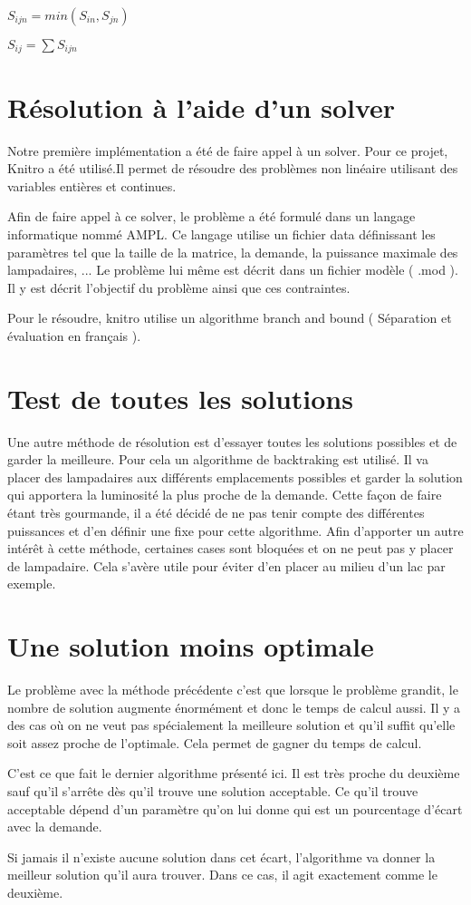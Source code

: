 $
S_{ijn}=min(S_{in},S_{jn})
$

$
S_{ij}=\sum{S_{ijn}}
$

\section{Résolution à l'aide d'un solver}
Notre première implémentation a été de faire appel à un solver. Pour ce projet, Knitro a été utilisé.Il permet de résoudre des problèmes non linéaire utilisant des variables entières et continues.

Afin de faire appel à ce solver, le problème a été formulé dans un langage informatique nommé AMPL. Ce langage utilise un fichier data définissant les paramètres tel que la taille de la matrice, la demande, la puissance maximale des lampadaires, ... 
Le problème lui même est décrit dans un fichier modèle ( .mod ). Il y est décrit l'objectif du problème ainsi que ces contraintes.

Pour le résoudre, knitro utilise un algorithme branch and bound ( Séparation et évaluation en français ).


\section{Test de toutes les solutions}
Une autre méthode de résolution est d'essayer toutes les solutions possibles et de garder la meilleure. Pour cela un algorithme de backtraking est utilisé. Il va placer des lampadaires aux différents emplacements possibles et garder la solution qui apportera la luminosité la plus proche de la demande.
Cette façon de faire étant très gourmande, il a été décidé de ne pas tenir compte des différentes puissances et d'en définir une fixe pour cette algorithme. Afin d'apporter un autre intérêt à cette méthode,  certaines cases sont bloquées et on ne peut pas y placer de lampadaire. Cela s'avère utile pour éviter d'en placer au milieu d'un lac par exemple.

\section{Une solution moins optimale}
Le problème avec la méthode précédente c'est que lorsque le problème grandit, le nombre de solution augmente énormément et donc le temps de calcul aussi. Il y a des cas où on ne veut pas spécialement la meilleure solution et qu'il suffit qu'elle soit assez proche de l'optimale. Cela permet de gagner du temps de calcul. 

C'est ce que fait le dernier algorithme présenté ici. Il est très proche du deuxième sauf qu'il s'arrête dès qu'il trouve une solution acceptable. Ce qu'il trouve acceptable dépend d'un paramètre qu'on lui donne qui est un pourcentage d'écart avec la demande.

Si jamais il n'existe aucune solution dans cet écart, l'algorithme va donner la meilleur solution qu'il aura trouver. Dans ce cas, il agit exactement comme le deuxième.